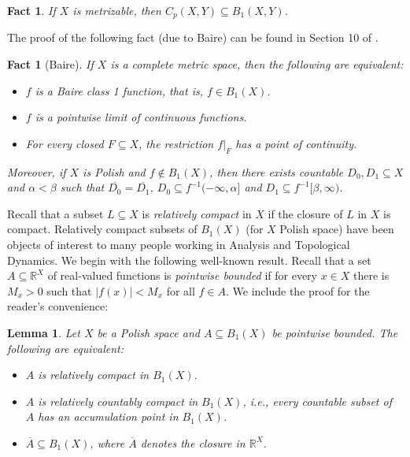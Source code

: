 \documentclass[psamsfonts]{amsart}
\newtheorem{lem}[thm]{Lemma}
\newtheorem{fact}[thm]{Fact}
\theoremstyle{definition}
\theoremstyle{remark}
\numberwithin{equation}{section}
\begin{document}
\begin{fact}
If $X$ is metrizable, then $C_p(X,Y)\subseteq B_1(X,Y)$.
\end{fact}

The proof of the following fact (due to Baire) can be found in Section 10 of \cite{Todorcevic_1997_TopicsTop}.

\begin{fact}[Baire]\label{baire}
    If $X$ is a complete metric space, then the following are equivalent:
    \begin{itemize}
        \item [(i)] $f$ is a Baire class 1 function, that is, $f\in B_1(X)$.
        \item [(ii)] $f$ is a pointwise limit of continuous functions.
        \item [(iii)] For every closed $F\subseteq X$, the restriction $f|_F$ has a point of continuity.
    \end{itemize}
    Moreover, if $X$ is Polish and $f\notin B_1(X)$, then there exists countable $D_0,D_1\subseteq X$ and $\alpha<\beta$ such that $\overline{D_0}=\overline{D_1}$, $D_0\subseteq f^{-1}(-\infty,\alpha]$ and $D_1\subseteq f^{-1}[\beta,\infty)$.
\end{fact}

Recall that a subset $L\subseteq X$ is \emph{relatively compact} in $X$ if the closure of $L$ in $X$ is compact. Relatively compact subsets of $B_1(X)$ (for $X$ Polish space) have been objects of interest to many people working in Analysis and Topological Dynamics. We begin with the following well-known result. Recall that a set $A\subseteq\mathbb{R}^X$ of real-valued functions is \emph{pointwise bounded} if for every $x\in X$ there is $M_x>0$ such that $|f(x)|<M_x$ for all $f\in A$. We include the proof for the reader's convenience:

\begin{lem}
    Let $X$ be a Polish space and $A\subseteq B_1(X)$ be pointwise bounded. The following are equivalent:
    \begin{itemize}
        \item [(i)] $A$ is relatively compact in $B_1(X)$.
        \item [(ii)] $A$ is relatively countably compact in $B_1(X)$, i.e., every countable subset of $A$ has an accumulation point in $B_1(X)$.
        \item [(iii)] $\overline{A}\subseteq B_1(X)$, where $\overline{A}$ denotes the closure in $\mathbb{R}^X$.
    \end{itemize}
\end{lem}
\end{document}
